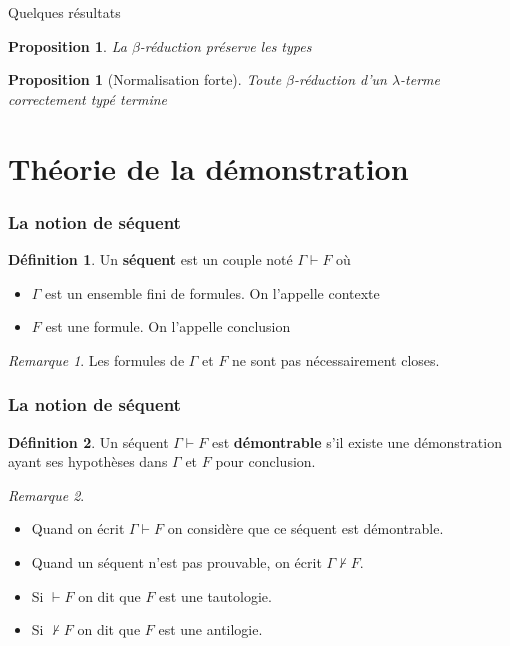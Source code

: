\documentclass[11pt,a4paper]{beamer}
\theoremstyle{plain}
\newtheorem{prop}[thm]{Proposition}
\theoremstyle{definition}
\newtheorem{defn}{Définition}[section]
\theoremstyle{remark}
\newtheorem*{rem}{Remarque}
\begin{document}
\begin{frame}{Quelques résultats}
\begin{prop}
La $\beta$-réduction préserve les types
\end{prop}

\begin{prop}[Normalisation forte]
Toute $\beta$-réduction d'un $\lambda$-terme correctement typé termine
\end{prop}
\end{frame}

\section{Théorie de la démonstration}
\begin{frame}
\frametitle{La notion de séquent}
\begin{defn}
Un \textbf{séquent} est un couple noté $\Gamma \vdash F$ où
\begin{itemize}
	\item $\Gamma$ est un ensemble fini de formules. On l'appelle contexte
	\item $F$ est une formule. On l'appelle conclusion
\end{itemize}
\end{defn}

\begin{rem}
Les formules de $\Gamma$ et $F$ ne sont pas nécessairement closes.
\end{rem}
\end{frame}

\begin{frame}
\frametitle{La notion de séquent}
\begin{defn}
Un séquent $\Gamma \vdash F$ est \textbf{démontrable} s'il existe une démonstration ayant ses hypothèses dans $\Gamma$ et $F$ pour conclusion.
\end{defn}

\begin{rem}
\begin{itemize}
	\item Quand on écrit $\Gamma \vdash F$ on considère que ce séquent est démontrable.
	\item Quand un séquent n'est pas prouvable, on écrit $\Gamma \nvdash F$.
	\item Si $\vdash F$ on dit que $F$ est une tautologie.
	\item Si $\nvdash F$ on dit que $F$ est une antilogie.
\end{itemize}
\end{rem}
\end{frame}
\end{document}

